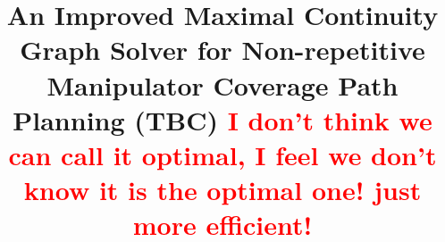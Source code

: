 \documentclass[conference]{IEEEtran}
\begin{document}
\title{An Improved Maximal Continuity Graph Solver for Non-repetitive Manipulator Coverage Path Planning (TBC) \textcolor{red}{I don't think we can call it optimal, I feel we don't know it is the optimal one! just more efficient!}}%

%

\maketitle
\end{document}
